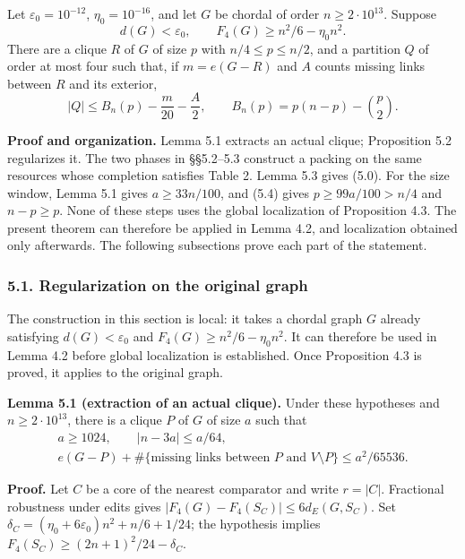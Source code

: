 \documentclass[english,11pt,a4paper]{article}
\begin{document}
Let \(\varepsilon_0=10^{-12}\), \(\eta_0=10^{-16}\), and let \(G\) be chordal of order \(n\ge2\cdot10^{13}\). Suppose \[
d(G)<\varepsilon_0,\qquad F_4(G)\ge n^2/6-\eta_0n^2.
\] There are a clique \(R\) of \(G\) of size \(p\) with \(n/4\le p\le n/2\), and a partition \(Q\) of order at most four such that, if \(m=e(G-R)\) and \(A\) counts missing links between \(R\) and its exterior, \[
|Q|\le B_n(p)-\frac m{20}-\frac A2,\qquad
B_n(p)=p(n-p)-\binom p2.
\tag{5.0}
\]

\textbf{Proof and organization.} Lemma 5.1 extracts an actual clique; Proposition 5.2 regularizes it. The two phases in §§5.2--5.3 construct a packing on the same resources whose completion satisfies Table 2. Lemma 5.3 gives (5.0). For the size window, Lemma 5.1 gives \(a\ge33n/100\), and (5.4) gives \(p\ge99a/100>n/4\) and \(n-p\ge p\). None of these steps uses the global localization of Proposition 4.3. The present theorem can therefore be applied in Lemma 4.2, and localization obtained only afterwards. The following subsections prove each part of the statement.

\subsubsection{5.1. Regularization on the original graph}\label{regularization-on-the-original-graph}

The construction in this section is local: it takes a chordal graph \(G\) already satisfying \(d(G)<\varepsilon_0\) and \(F_4(G)\ge n^2/6-\eta_0n^2\). It can therefore be used in Lemma 4.2 before global localization is established. Once Proposition 4.3 is proved, it applies to the original graph.


\textbf{Lemma 5.1 (extraction of an actual clique).} Under these hypotheses and \(n\ge2\cdot10^{13}\), there is a clique \(P\) of \(G\) of size \(a\) such that \[
\begin{gathered}
a\ge1024,\qquad |n-3a|\le a/64,\\
e(G-P)+\#\{\text{missing links between }P\text{ and }V\setminus P\}
\le a^2/65536.
\end{gathered}
\tag{5.1}
\]

\textbf{Proof.} Let \(C\) be a core of the nearest comparator and write \(r=|C|\). Fractional robustness under edits gives \(|F_4(G)-F_4(S_C)|\le6d_E(G,S_C)\). Set \(\delta_C=(\eta_0+6\varepsilon_0)n^2+n/6+1/24\); the hypothesis implies \(F_4(S_C)\ge(2n+1)^2/24-\delta_C\).
\end{document}

